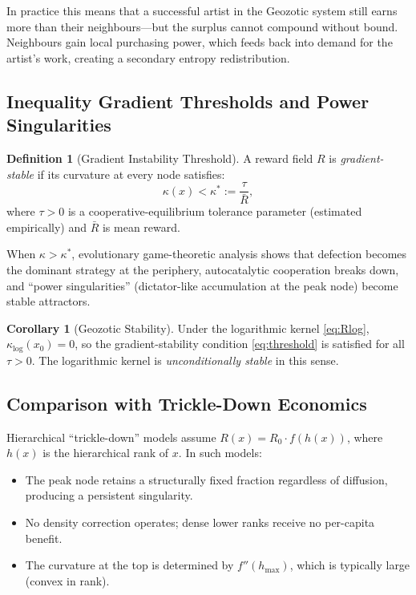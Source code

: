 \documentclass[12pt,a4paper]{article}
\theoremstyle{definition}
\newtheorem{definition}{Definition}[section]
\newtheorem{corollary}{Corollary}[section]
\begin{document}
\noindent In practice this means that a successful artist in the Geozotic
system still earns more than their neighbours---but the surplus cannot
compound without bound.  Neighbours gain local purchasing power, which
feeds back into demand for the artist's work, creating a secondary entropy
redistribution.

\subsection{Inequality Gradient Thresholds and Power Singularities}

\begin{definition}[Gradient Instability Threshold]
  A reward field $R$ is \emph{gradient-stable} if its curvature at every node
  satisfies:
  \begin{equation}
    \kappa(x) < \kappa^* := \frac{\tau}{\bar{R}},
    \label{eq:threshold}
  \end{equation}
  where $\tau > 0$ is a cooperative-equilibrium tolerance parameter (estimated
  empirically) and $\bar{R}$ is mean reward.
\end{definition}

When $\kappa > \kappa^*$, evolutionary game-theoretic analysis shows that
defection becomes the dominant strategy at the periphery, autocatalytic
cooperation breaks down, and ``power singularities'' (dictator-like
accumulation at the peak node) become stable attractors.

\begin{corollary}[Geozotic Stability]
  Under the logarithmic kernel \eqref{eq:Rlog}, $\kappa_{\log}(x_0) = 0$,
  so the gradient-stability condition \eqref{eq:threshold} is satisfied for
  all $\tau > 0$.  The logarithmic kernel is \emph{unconditionally stable} in
  this sense.
\end{corollary}

\subsection{Comparison with Trickle-Down Economics}

Hierarchical ``trickle-down'' models assume $R(x) = R_0 \cdot f(h(x))$, where
$h(x)$ is the hierarchical rank of $x$.  In such models:

\begin{itemize}[leftmargin=*]
  \item The peak node retains a structurally fixed fraction regardless of
    diffusion, producing a persistent singularity.
  \item No density correction operates; dense lower ranks receive no
    per-capita benefit.
  \item The curvature at the top is determined by $f''(h_{\max})$, which is
    typically large (convex in rank).
\end{itemize}
\end{document}
